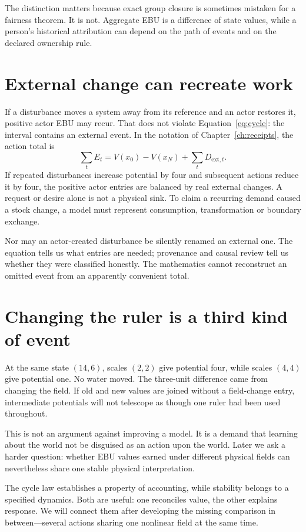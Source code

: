 The distinction matters because exact group closure is sometimes mistaken
for a fairness theorem. It is not. Aggregate EBU is a difference of state
values, while a person's historical attribution can depend on the path of
events and on the declared ownership rule.

\section{External change can recreate work}
If a disturbance moves a system away from its reference and an actor
restores it, positive actor EBU may recur. That does not violate
Equation~\ref{eq:cycle}: the interval contains an external event. In the
notation of Chapter~\ref{ch:receipts}, the action total is
\[
 \sum_t E_t=V(x_0)-V(x_N)+\sum_t D_{{\mathrm{ext}},t}.
\]
If repeated disturbances increase potential by four and subsequent actions
reduce it by four, the positive actor entries are balanced by real external
changes. A request or desire alone is not a physical sink. To claim a
recurring demand caused a stock change, a model must represent consumption,
transformation or boundary exchange.

Nor may an actor-created disturbance be silently renamed an external one.
The equation tells us what entries are needed; provenance and causal review
tell us whether they were classified honestly. The mathematics cannot
reconstruct an omitted event from an apparently convenient total.

\section{Changing the ruler is a third kind of event}
At the same state $(14,6)$, scales $(2,2)$ give potential four, while scales
$(4,4)$ give potential one. No water moved. The three-unit difference came
from changing the field. If old and new values are joined without a
field-change entry, intermediate potentials will not telescope as though
one ruler had been used throughout.

This is not an argument against improving a model. It is a demand that
learning about the world not be disguised as an action upon the world.
Later we ask a harder question: whether EBU values earned under different
physical fields can nevertheless share one stable physical interpretation.

The cycle law establishes a property of accounting, while stability belongs to a specified dynamics. Both are useful: one reconciles value, the other explains response. We will connect them after developing the missing comparison in between---several actions sharing one nonlinear field at the same time.
